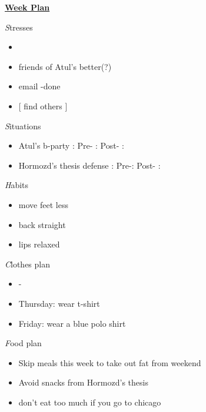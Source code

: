 \documentclass[serif,mathserif,final]{beamer}
\begin{document}
\begin{frame}{}
\begin{columns}[t]
\begin{column}{0.27\linewidth} {\textbf{\underline{Week Plan}}} 

  \begin{block}{\textit Stresses} 
    \begin{itemize} 
      \small \item \small 
    \item \small friends of Atul's better(?)
    \item \small email -done  
    \item \small [ find others ]
    \end{itemize} 
  \end{block} 

  \begin{block}{\textit Situations} 
    \begin{itemize} 
    \small \item \small Atul's b-party : Pre- :    Post- :   
    \item \small Hormozd's thesis defense : Pre-:  Post- : 
    \end{itemize} 
  \end{block} 

  \begin{block}{\textit Habits } 
    \begin{itemize} 
    \small \item \small move feet less
    \item \small back straight 
    \item \small lips relaxed 
    \end{itemize} 
  \end{block} 

  \begin{block}{\textit Clothes plan } 
    \begin{itemize} 
      \small \item \small - 
    \item \small Thursday: wear t-shirt 
    \item \small Friday: wear a blue polo shirt
    \end{itemize} 
  \end{block} 

  \begin{block}{\textit Food plan } 
    \begin{itemize} 
      \small \item \small Skip meals this week to take out fat from weekend 
    \item \small Avoid snacks from Hormozd's thesis 
    \item \small don't eat too much if you go to chicago 



\end{itemize}
\end{block}
\end{column}
\end{columns}
\end{frame}
\end{document}
